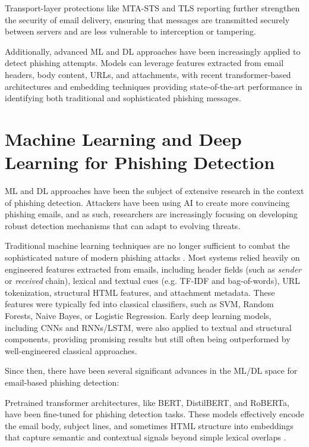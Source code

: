 Transport-layer protections like \ac{MTA-STS} and \ac{TLS} reporting further strengthen the security of email delivery, ensuring that messages are transmitted securely between servers and are less vulnerable to interception or tampering.

Additionally, advanced \ac{ML} and \ac{DL} approaches have been increasingly applied to detect phishing attempts. Models can leverage features extracted from email headers, body content, URLs, and attachments, with recent transformer-based architectures and embedding techniques providing state-of-the-art performance in identifying both traditional and sophisticated phishing messages.

\section{Machine Learning and Deep Learning for Phishing Detection}

\ac{ML} and \ac{DL} approaches have been the subject of extensive research in the context of phishing detection.
Attackers have been using \ac{AI} to create more convincing phishing emails, and as such, researchers are increasingly focusing on developing robust detection mechanisms that can adapt to evolving threats.

Traditional machine learning techniques are no longer sufficient to combat the sophisticated nature of modern phishing attacks \cite{Fernandes2024}. Most systems relied heavily on engineered features extracted from emails, including header fields (such as \textit{sender} or \textit{received} chain), lexical and textual cues (e.g. \ac{TF-IDF} and bag-of-words), URL tokenization, structural HTML features, and attachment metadata. These features were typically fed into classical classifiers, such as \ac{SVM}, Random Forests, Naive Bayes, or Logistic Regression. Early deep learning models, including \acp{CNN} and \acp{RNN}/\ac{LSTM}, were also applied to textual and structural components, providing promising results but still often being outperformed by well-engineered classical approaches. 

Since then, there have been several significant advances in the \ac{ML}/\ac{DL} space for email-based phishing detection:

Pretrained transformer architectures, like \ac{BERT}, \ac{DistilBERT}, and \ac{RoBERTa}, have been fine-tuned for phishing detection tasks. These models effectively encode the email body, subject lines, and sometimes HTML structure into embeddings that capture semantic and contextual signals beyond simple lexical overlaps \cite{uddin2025}.


